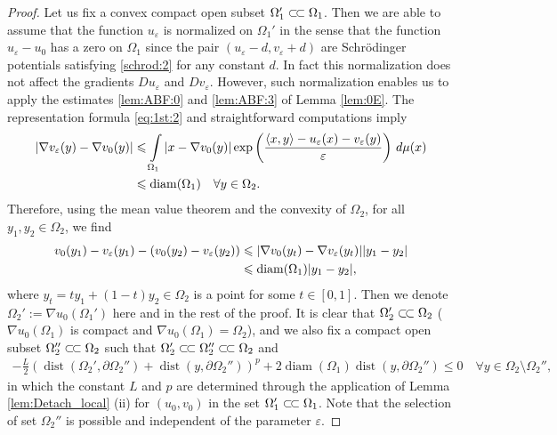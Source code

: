 \documentclass[reqno,12pt]{article}
\DeclareMathOperator{\dist}{dist}
\DeclareMathOperator{\diam}{diam}
\newcommand{\inner}[2]{\left\langle #1, #2 \right\rangle}
\newcommand{\I}{\int\limits}
\newcommand{\ssubset}{\subset\joinrel\subset}
\begin{document}
\begin{proof}
    Let us fix a convex compact open subset $\Omega_{1}'\ssubset \Omega_{1}$. Then we are able to assume that the function $u_{\varepsilon}$ is normalized on $\Omega_{1}'$ in the sense that the function $u_{\varepsilon}-u_{0}$ has a zero on $\Omega_{1}$ since the pair $(u_{\varepsilon}-d,v_{\varepsilon}+d)$ are Schr\"odinger potentials satisfying \eqref{schrod:2} for any constant $d$. In fact this normalization does not affect the gradients $Du_{\varepsilon}$ and $Dv_{\varepsilon}$. However, such normalization enables us to apply the estimates \eqref{lem:ABF:0} and \eqref{lem:ABF:3} of Lemma \ref{lem:0E}. The representation formula \eqref{eq:1st:2} and straightforward computations imply
\begin{align*}
    |\nabla v_{\varepsilon}(y)-\nabla v_{0}(y)| 
    &\leqslant
    \I_{\Omega_{1}} |x-\nabla v_{0}(y)|\exp\left( \frac{\inner{x}{y}-u_{\varepsilon}(x)-v_{\varepsilon}(y)}{\varepsilon} \right)\,d\mu(x)
    \notag\\&
    \leqslant
    \diam(\Omega_{1})\quad \forall y\in\Omega_{2}.
\end{align*}
Therefore, using the mean value theorem and the convexity of $\Omega_{2}$, for all $y_{1},y_{2}\in \Omega_{2}$, we find 
\begin{align}
    \label{ABF:s3:2}
    v_{0}(y_1)-v_{\varepsilon}(y_1)-(v_{0}(y_2)-v_{\varepsilon}(y_2))
    &\leqslant
    |\nabla v_{0}(y_{t})-\nabla v_{\varepsilon}(y_{t})||y_1-y_2|
    \notag\\&
    \leqslant
    \diam(\Omega_{1})|y_1-y_2|,
\end{align}
where $y_{t} = ty_1 + (1-t)y_{2}\in \Omega_{2}$ is a point for some $t\in [0,1]$. Then we denote $\Omega_{2}':= \nabla u_{0}(\Omega_{1}')$ here and in the rest of the proof.
It is clear \cite[Lemma A.22]{Fig17} that $\Omega_{2}'\ssubset \Omega_{2}$ ($\nabla u_{0}(\Omega_{1})$ is compact and $\nabla u_{0}(\Omega_{1}) = \Omega_{2}$), and we also fix a compact open subset $\Omega_{2}''\ssubset \Omega_{2}$ such that $\Omega_{2}'\ssubset \Omega_{2}'' \ssubset \Omega_{2}$ and 
\begin{align*}
    -\frac{L}{2}\left( \dist(\Omega_{2}',\partial \Omega_{2}'') + \dist(y,\partial \Omega_{2}'') \right)^{p} + 2\diam(\Omega_{1})\dist(y,\partial\Omega_{2}'') \leqslant 0 \quad \forall y\in \Omega_{2}\setminus \Omega_{2}'',
\end{align*}
in which the constant $L$ and $p$ are determined through the application of Lemma \ref{lem:Detach_local} (ii) for $(u_{0},v_{0})$ in the set $\Omega_{1}'\ssubset \Omega_{1}$. Note that the selection of set $\Omega_{2}''$ is possible and independent of the parameter $\varepsilon$.



\end{proof}
\end{document}
